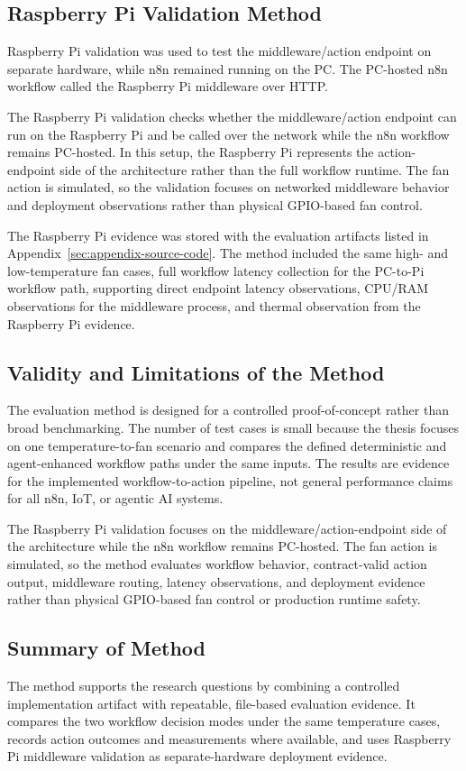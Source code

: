 \subsection{Raspberry Pi Validation Method}\label{subsec:pi-validation-method}



Raspberry Pi validation was used to test the middleware/action endpoint on separate hardware, while n8n remained running on the PC. The PC-hosted n8n workflow called the Raspberry Pi middleware over HTTP.

The Raspberry Pi validation checks whether the middleware/action endpoint can run on the Raspberry Pi and be called over the network while the n8n workflow remains PC-hosted. In this setup, the Raspberry Pi represents the action-endpoint side of the architecture rather than the full workflow runtime. The fan action is simulated, so the validation focuses on networked middleware behavior and deployment observations rather than physical GPIO-based fan control.


The Raspberry Pi evidence was stored with the evaluation artifacts listed in Appendix~\ref{sec:appendix-source-code}. The method included the same high- and low-temperature fan cases, full workflow latency collection for the PC-to-Pi workflow path, supporting direct endpoint latency observations, CPU/RAM observations for the middleware process, and thermal observation from the Raspberry Pi evidence.

\subsection{Validity and Limitations of the Method}\label{subsec:method-validity-limitations}


The evaluation method is designed for a controlled proof-of-concept rather than broad benchmarking. The number of test cases is small because the thesis focuses on one temperature-to-fan scenario and compares the defined deterministic and agent-enhanced workflow paths under the same inputs. The results are evidence for the implemented workflow-to-action pipeline, not general performance claims for all n8n, IoT, or agentic AI systems.



The Raspberry Pi validation focuses on the middleware/action-endpoint side of the architecture while the n8n workflow remains PC-hosted. The fan action is simulated, so the method evaluates workflow behavior, contract-valid action output, middleware routing, latency observations, and deployment evidence rather than physical GPIO-based fan control or production runtime safety.


	\subsection{Summary of Method}\label{subsec:method-summary}

The method supports the research questions by combining a controlled implementation artifact with repeatable, file-based evaluation evidence. It compares the two workflow decision modes under the same temperature cases, records action outcomes and measurements where available, and uses Raspberry Pi middleware validation as separate-hardware deployment evidence.
